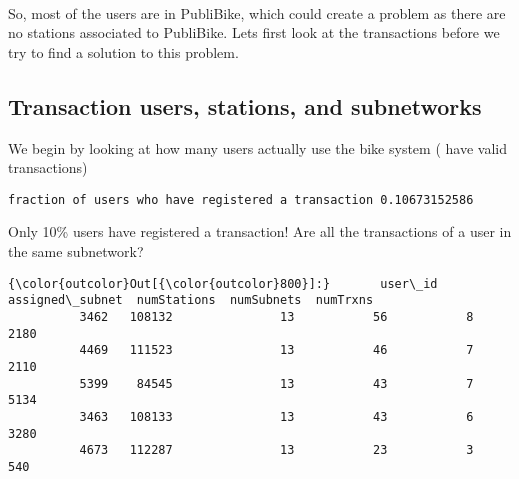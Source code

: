 \documentclass{report}
\begin{document}
        
    \begin{center}
    \end{center}
    { \hspace*{\fill} \\}
    
    So, most of the users are in PubliBike, which could create a problem as
there are no stations associated to PubliBike. Lets first look at the
transactions before we try to find a solution to this problem.

\subsection{Transaction users, stations, and
subnetworks}\label{transaction-users-stations-and-subnetworks}

We begin by looking at how many users actually use the bike system (
have valid transactions)


    \begin{Verbatim}[commandchars=\\\{\}]
fraction of users who have registered a transaction 0.10673152586
    \end{Verbatim}

    Only 10\% users have registered a transaction! Are all the transactions
of a user in the same subnetwork?



            \begin{Verbatim}[commandchars=\\\{\}]
{\color{outcolor}Out[{\color{outcolor}800}]:}       user\_id  assigned\_subnet  numStations  numSubnets  numTrxns
          3462   108132               13           56           8      2180
          4469   111523               13           46           7      2110
          5399    84545               13           43           7      5134
          3463   108133               13           43           6      3280
          4673   112287               13           23           3       540
\end{Verbatim}
        

        
    \begin{center}
    \end{center}
    { \hspace*{\fill} \\}
    
\end{document}
